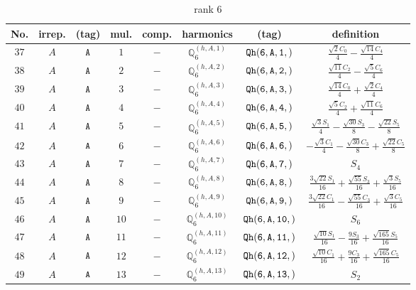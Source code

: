 \documentclass[fleqn,8pt]{jsarticle}
\begin{document}
\begin{table}[ht!]
\begin{center}
\caption{rank 6}
\renewcommand{\arraystretch}{1.3}
\begin{tabular}{cccccccc} \hline \hline
No. & irrep. & (tag) & mul. & comp. & harmonics & (tag) & definition \\ \hline
$ 37 $ & $ A $ & $ {\tt A} $ & $ 1 $ & $ - $ & $ \mathbb{Q}_{6}^{(h,A,1)} $ & $ {\tt Qh(6,A,1,)} $ & $ \frac{\sqrt{2} C_{0}}{4} - \frac{\sqrt{14} C_{4}}{4} $ \\
$ 38 $ & $ A $ & $ {\tt A} $ & $ 2 $ & $ - $ & $ \mathbb{Q}_{6}^{(h,A,2)} $ & $ {\tt Qh(6,A,2,)} $ & $ \frac{\sqrt{11} C_{2}}{4} - \frac{\sqrt{5} C_{6}}{4} $ \\
$ 39 $ & $ A $ & $ {\tt A} $ & $ 3 $ & $ - $ & $ \mathbb{Q}_{6}^{(h,A,3)} $ & $ {\tt Qh(6,A,3,)} $ & $ \frac{\sqrt{14} C_{0}}{4} + \frac{\sqrt{2} C_{4}}{4} $ \\
$ 40 $ & $ A $ & $ {\tt A} $ & $ 4 $ & $ - $ & $ \mathbb{Q}_{6}^{(h,A,4)} $ & $ {\tt Qh(6,A,4,)} $ & $ \frac{\sqrt{5} C_{2}}{4} + \frac{\sqrt{11} C_{6}}{4} $ \\
$ 41 $ & $ A $ & $ {\tt A} $ & $ 5 $ & $ - $ & $ \mathbb{Q}_{6}^{(h,A,5)} $ & $ {\tt Qh(6,A,5,)} $ & $ \frac{\sqrt{3} S_{1}}{4} - \frac{\sqrt{30} S_{3}}{8} - \frac{\sqrt{22} S_{5}}{8} $ \\
$ 42 $ & $ A $ & $ {\tt A} $ & $ 6 $ & $ - $ & $ \mathbb{Q}_{6}^{(h,A,6)} $ & $ {\tt Qh(6,A,6,)} $ & $ - \frac{\sqrt{3} C_{1}}{4} - \frac{\sqrt{30} C_{3}}{8} + \frac{\sqrt{22} C_{5}}{8} $ \\
$ 43 $ & $ A $ & $ {\tt A} $ & $ 7 $ & $ - $ & $ \mathbb{Q}_{6}^{(h,A,7)} $ & $ {\tt Qh(6,A,7,)} $ & $ S_{4} $ \\
$ 44 $ & $ A $ & $ {\tt A} $ & $ 8 $ & $ - $ & $ \mathbb{Q}_{6}^{(h,A,8)} $ & $ {\tt Qh(6,A,8,)} $ & $ \frac{3 \sqrt{22} S_{1}}{16} + \frac{\sqrt{55} S_{3}}{16} + \frac{\sqrt{3} S_{5}}{16} $ \\
$ 45 $ & $ A $ & $ {\tt A} $ & $ 9 $ & $ - $ & $ \mathbb{Q}_{6}^{(h,A,9)} $ & $ {\tt Qh(6,A,9,)} $ & $ \frac{3 \sqrt{22} C_{1}}{16} - \frac{\sqrt{55} C_{3}}{16} + \frac{\sqrt{3} C_{5}}{16} $ \\
$ 46 $ & $ A $ & $ {\tt A} $ & $ 10 $ & $ - $ & $ \mathbb{Q}_{6}^{(h,A,10)} $ & $ {\tt Qh(6,A,10,)} $ & $ S_{6} $ \\
$ 47 $ & $ A $ & $ {\tt A} $ & $ 11 $ & $ - $ & $ \mathbb{Q}_{6}^{(h,A,11)} $ & $ {\tt Qh(6,A,11,)} $ & $ \frac{\sqrt{10} S_{1}}{16} - \frac{9 S_{3}}{16} + \frac{\sqrt{165} S_{5}}{16} $ \\
$ 48 $ & $ A $ & $ {\tt A} $ & $ 12 $ & $ - $ & $ \mathbb{Q}_{6}^{(h,A,12)} $ & $ {\tt Qh(6,A,12,)} $ & $ \frac{\sqrt{10} C_{1}}{16} + \frac{9 C_{3}}{16} + \frac{\sqrt{165} C_{5}}{16} $ \\
$ 49 $ & $ A $ & $ {\tt A} $ & $ 13 $ & $ - $ & $ \mathbb{Q}_{6}^{(h,A,13)} $ & $ {\tt Qh(6,A,13,)} $ & $ S_{2} $ \\
 \hline \hline
\end{tabular}
\end{center}
\end{table}
\end{document}
